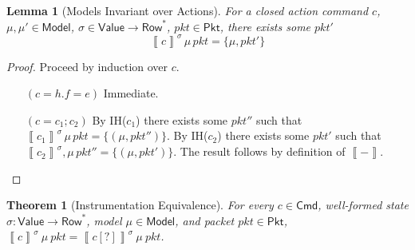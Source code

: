 \documentclass{article}
\newcommand{\pkt}{\mathit{pkt}}
\newcommand{\denote}[1]{\left\llbracket#1\right\rrbracket}
\newcommand{\Value}{\mathsf{Value}}
\newcommand{\Cmd}{\mathsf{Cmd}}
\newcommand{\Pkt}{\mathsf{Pkt}}
\newcommand{\Model}{\mathsf{Model}}
\newcommand{\Row}{\mathsf{Row}}
\newtheorem{theorem}{Theorem}
\newtheorem{lemma}{Lemma}
\begin{document}
\begin{lemma}[Models Invariant over Actions]
  \label{lem:models-invariant-over-actions}
  For a closed action command $c$, $\mu,\mu'
  \in \Model$, $\sigma \in \Value \to
  \Row^*$, $\pkt \in \Pkt$, there exists some $\pkt'$
  \[\denote{c}^\sigma\,\mu\,\pkt = \{\mu,\pkt'\}\]
  \end{lemma}

\begin{proof}
  Proceed by induction over $c$.
  \begin{enumerate}[align=left]
  \item[$(c = h.f = e)$] Immediate.
  \item[$(c = c_1;c_2)$]
    By IH($c_1$) there exists some $\pkt''$ such that
    $\denote{c_1}^\sigma\,\mu\,\pkt = \{(\mu,\pkt'')\}$.
    By IH($c_2$) there exists some $\pkt'$ such that
    $\denote{c_2}^\sigma,\mu\,pkt'' = \{(\mu, \pkt')\}$.
    The result follows by definition of $\denote{-}$.
    \end{enumerate}
\end{proof}

\begin{theorem}[Instrumentation Equivalence]
  \label{thm:instr-equiv}
  For every $c \in \Cmd$, well-formed state $\sigma : \Value \to \Row^*$, model
  $\mu \in \Model$, and packet $\pkt \in \Pkt$, $\denote{c}^\sigma~\mu~\pkt =
  \denote{c[?]}^\sigma~\mu~\pkt$.
\end{theorem}
\end{document}
